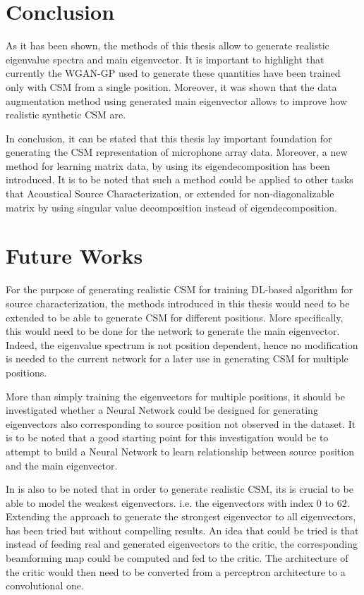 \documentclass[11pt,a4paper,twoside]{report}
\begin{document}
\chapter{Conclusion}

As it has been shown, the methods of this thesis allow to generate realistic eigenvalue spectra and main eigenvector. It is important to highlight that currently the WGAN-GP used to generate these quantities have been trained only with CSM from a single position. Moreover, it was shown that the data augmentation method using generated main eigenvector allows to improve how realistic synthetic CSM are.

In conclusion, it can be stated that this thesis lay important foundation for generating the CSM representation of microphone array data. Moreover, a new method for learning matrix data, by using its eigendecomposition has been introduced. It is to be noted that such a method could be applied to other tasks that Acoustical Source Characterization, or extended for non-diagonalizable matrix by using singular value decomposition instead of eigendecomposition.

\chapter{Future Works}

For the purpose of generating realistic CSM for training DL-based algorithm for source characterization, the methods introduced in this thesis would need to be extended to be able to generate CSM for different positions. More specifically, this would need to be done for the network to generate the main eigenvector. Indeed, the eigenvalue spectrum is not position dependent, hence no modification is needed to the current network for a later use in generating CSM for multiple positions.

More than simply training the eigenvectors for multiple positions, it should be investigated whether a Neural Network could be designed for generating eigenvectors also corresponding to source position not observed in the dataset. It is to be noted that a good starting point for this investigation would be to attempt to build a Neural Network to learn relationship between source position and the main eigenvector.

In is also to be noted that in order to generate realistic CSM, its is crucial to be able to model the weakest eigenvectors. i.e. the eigenvectors with index $0$ to $62$. Extending the approach to generate the strongest eigenvector to all eigenvectors, has been tried but without compelling results. An idea that could be tried is that instead of feeding real and generated eigenvectors to the critic, the corresponding beamforming map could be computed and fed to the critic. The architecture of the critic would then need to be converted from a perceptron architecture to a convolutional one. 
\end{document}
